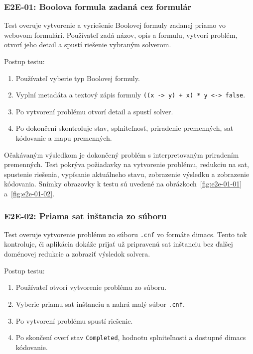 \subsubsection{E2E-01: Boolova formula zadaná cez formulár}\label{sec:testing:e2e-01}
Test overuje vytvorenie a vyriešenie Boolovej formuly zadanej priamo vo webovom formulári. Používateľ zadá názov, opis a formulu, vytvorí problém, otvorí jeho detail a spustí riešenie vybraným solverom.

Postup testu:
\begin{enumerate}
    \item Používateľ vyberie typ Boolovej formuly.
    \item Vyplní metadáta a textový zápis formuly \texttt{((x -> y) + x) * y <-> false}.
    \item Po vytvorení problému otvorí detail a spustí solver.
    \item Po dokončení skontroluje stav, splniteľnosť, priradenie premenných, \acrshort{sat} kódovanie a mapu premenných.
\end{enumerate}

Očakávaným výsledkom je dokončený problém s interpretovaným priradením premenných. Test pokrýva požiadavky na vytvorenie problému, redukciu na \acrshort{sat}, spustenie riešenia, vypísanie aktuálneho stavu, zobrazenie výsledku a zobrazenie kódovania. Snímky obrazovky k testu sú uvedené na obrázkoch~\ref{fig:e2e-01-01} a~\ref{fig:e2e-01-02}.

\subsubsection{E2E-02: Priama \acrshort{sat} inštancia zo súboru}\label{sec:testing:e2e-02}
Test overuje vytvorenie problému zo súboru \texttt{.cnf} vo formáte \acrshort{dimacs}. Tento tok kontroluje, či aplikácia dokáže prijať už pripravenú \acrshort{sat} inštanciu bez ďalšej doménovej redukcie a zobraziť výsledok solvera.

Postup testu:
\begin{enumerate}
    \item Používateľ otvorí vytvorenie problému zo súboru.
    \item Vyberie priamu \acrshort{sat} inštanciu a nahrá malý súbor \texttt{.cnf}.
    \item Po vytvorení problému spustí riešenie.
    \item Po skončení overí stav \texttt{Completed}, hodnotu splniteľnosti a dostupné \acrshort{dimacs} kódovanie.
\end{enumerate}

